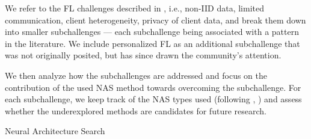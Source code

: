 We refer to the FL challenges described in \cite{nas_with_rl_2017}, i.e., non-IID data, limited communication, client heterogeneity, privacy of client data, and break them down into smaller subchallenges — each subchallenge being associated with a pattern in the literature. We include personalized FL \cite{personalized_fl_2023} as an additional subchallenge that was not originally posited, but has since drawn the community's attention. 

We then analyze how the subchallenges are addressed and focus on the contribution of the used NAS method towards overcoming the subchallenge. For each subchallenge, we keep track of the NAS types used (following \cite{nas_1000_papers_2023}, \cite{systematic_nas_survey_2024}) and assess whether the underexplored methods are candidates for future research.





Neural Architecture Search  
